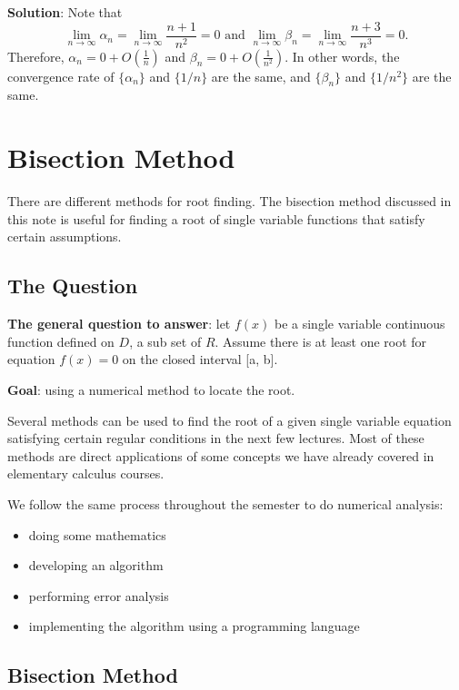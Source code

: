 \documentclass[
]{book}
\providecommand{\tightlist}{%
  \setlength{\itemsep}{0pt}\setlength{\parskip}{0pt}}
\begin{document}
\textbf{Solution}: Note that
\[
\lim_{n \to \infty}\alpha_n = \lim_{n \to \infty}\frac{n+1}{n^2} = 0 \text{ and  } \lim_{n \to \infty}\beta_n = \lim_{n \to \infty}\frac{n + 3}{n^3} = 0.
\]
Therefore, \(\alpha_n = 0 + O(\frac{1}{n})\) and \(\beta_n = 0 + O(\frac{1}{n^2})\). In other words, the convergence rate of \(\{\alpha_n \}\) and \(\{ 1/n\}\) are the same, and \(\{\beta_n\}\) and \(\{1/n^2 \}\) are the same.

\hypertarget{bisection-method}{%
\chapter{Bisection Method}\label{bisection-method}}

There are different methods for root finding. The bisection method discussed in this note is useful for finding a root of single variable functions that satisfy certain assumptions.

\hypertarget{the-question}{%
\section{The Question}\label{the-question}}

\textbf{The general question to answer}: let \(f(x)\) be a single variable continuous function defined on \(D\), a sub set of \(R\). Assume there is at least one root for equation \(f(x) = 0\) on the closed interval {[}a, b{]}.

\textbf{Goal}: using a numerical method to locate the root.

Several methods can be used to find the root of a given single variable equation satisfying certain regular conditions in the next few lectures. Most of these methods are direct applications of some concepts we have already covered in elementary calculus courses.

We follow the same process throughout the semester to do numerical analysis:

\begin{itemize}
\tightlist
\item
  doing some mathematics
\item
  developing an algorithm
\item
  performing error analysis
\item
  implementing the algorithm using a programming language
\end{itemize}

\hypertarget{bisection-method-1}{%
\section{Bisection Method}\label{bisection-method-1}}
\end{document}
